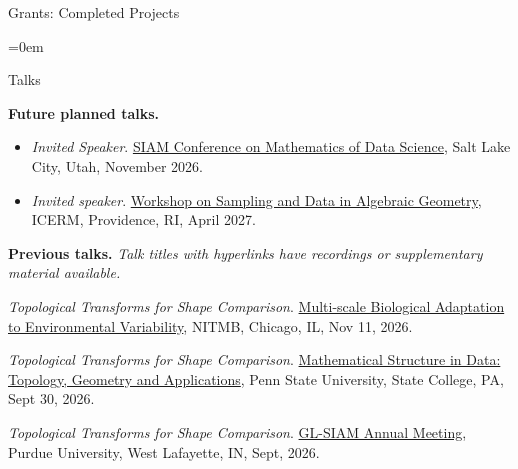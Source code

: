 \documentclass{resume} %
\begin{document}
\begin{rSection}{Grants: Completed Projects}
\begin{itemize}{}{\leftmargin=0em}

\end{itemize}
\vspace{-.1in}

\end{rSection}


%
\newpage
\begin{rSection}{Talks}

\textbf{{Future planned talks.}}
\begin{itemize}%
   \itemsep -0.1em %





\item \textit{Invited Speaker}. \href{https://www.siam.org/conferences-events/siam-conferences/mds26/}{SIAM Conference on Mathematics of Data Science}, Salt Lake City, Utah, November 2026.

\item \textit{Invited speaker}. \href{https://icerm.brown.edu/program/semester_program_workshop/sp-s27-w3}{Workshop on Sampling and Data in Algebraic Geometry}, ICERM, Providence, RI, April 2027.


\end{itemize}

\textbf{Previous talks.} \textit{Talk titles with hyperlinks have recordings or supplementary material available.}

\begin{etaremune}
\item\emph{Topological Transforms for Shape Comparison}. \href{https://www.nitmb.org/event/multi-scale-biological-adaptation-to-environmental-variability/}{Multi-scale Biological Adaptation to Environmental Variability}, NITMB, Chicago, IL, Nov 11, 2026. 

\item\emph{Topological Transforms for Shape Comparison}. \href{https://sites.google.com/view/msdtga-2026/}{Mathematical Structure in Data: Topology, Geometry and Applications}, Penn State University, State College, PA, Sept 30, 2026. 

\item\emph{Topological Transforms for Shape Comparison}. \href{https://www.purdue.edu/science/events/glsiam.html}{GL-SIAM Annual Meeting}, Purdue University, West Lafayette, IN, Sept, 2026. 


\end{etaremune}
\end{rSection}
\end{document}

